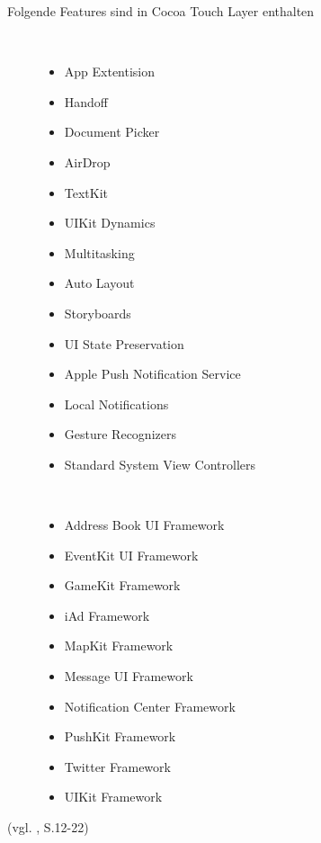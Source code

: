 \begin{description}
\item[Folgende Features sind in Cocoa Touch Layer enthalten]~\par
	\begin{multicols}{2}
	\begin{itemize}
		\item App Extentision
		\item Handoff
		\item Document Picker
		\item AirDrop
		\item TextKit
		\item UIKit Dynamics
		\item Multitasking
		\item Auto Layout
		\item Storyboards
		\item UI State Preservation
		\item Apple Push Notification Service
		\item Local Notifications
		\item Gesture Recognizers
		\item Standard System View Controllers
         \end{itemize}
	\end{multicols}
	
	 \item[\parbox{\textwidth} {Das Cocoa Touch Layer Framework beinhaltet folgende Frameworks}]~\par
	\begin{multicols}{2}
	\begin{itemize}
		\item Address Book UI Framework
		\item EventKit UI Framework
		\item GameKit Framework
		\item iAd Framework
		\item MapKit Framework
		\item Message UI Framework
		\item Notification Center Framework
		\item PushKit Framework
		\item Twitter Framework
		\item UIKit Framework
         \end{itemize}
	\end{multicols}
\end{description}
(vgl. \cite{Apple[6]}, S.12-22)

